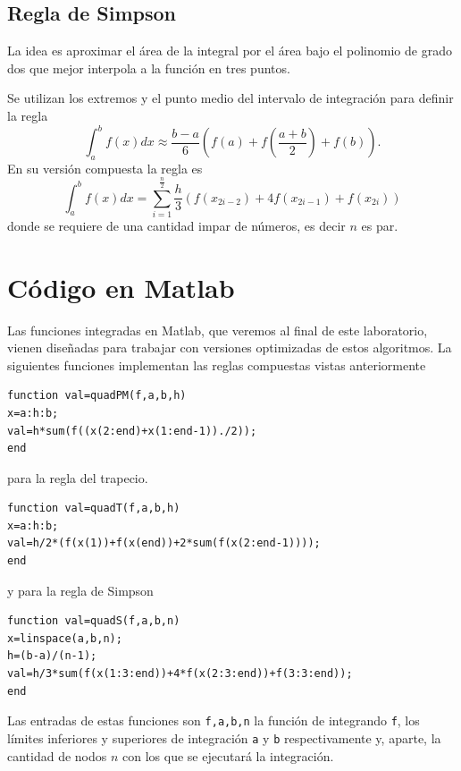 \documentclass[11pt]{article}
\begin{document}
\subsection{Regla de Simpson}
La idea es aproximar el \'area de la integral por el \'area bajo el polinomio de grado dos que mejor interpola a la funci\'on en tres puntos.
\begin{center}
\end{center}
Se utilizan los extremos y el punto medio del intervalo de integraci\'on para definir la regla
$$\int_a^bf(x)dx\approx\frac{b-a}{6}\left(f(a)+f\left(\frac{a+b}{2}\right)+f(b)\right).$$
En su versi\'on compuesta la regla es
$$\int_a^b f(x)dx = \sum_{i=1}^{\frac{n}{2}} \frac{h}{3}\left(f(x_{2i-2})+4f(x_{2i-1})+f(x_{2i})\right)$$
donde se requiere de una cantidad impar de n\'umeros, es decir $n$ es par. 

\section{C\'odigo en Matlab}
Las funciones integradas en Matlab, que veremos al final de este laboratorio, vienen diseñadas para trabajar con versiones optimizadas de estos algoritmos. La siguientes funciones implementan las reglas compuestas vistas anteriormente
\begin{lstlisting}
function val=quadPM(f,a,b,h)
x=a:h:b;
val=h*sum(f((x(2:end)+x(1:end-1))./2));
end
\end{lstlisting}
para la regla del trapecio. 
\begin{lstlisting}
function val=quadT(f,a,b,h)
x=a:h:b;
val=h/2*(f(x(1))+f(x(end))+2*sum(f(x(2:end-1))));
end
\end{lstlisting}
y para la regla de Simpson
\begin{lstlisting}
function val=quadS(f,a,b,n)
x=linspace(a,b,n);
h=(b-a)/(n-1);
val=h/3*sum(f(x(1:3:end))+4*f(x(2:3:end))+f(3:3:end));
end
\end{lstlisting}
Las entradas de estas funciones son \texttt{f,a,b,n} la funci\'on de integrando \texttt{f}, los l\'imites inferiores y superiores de integraci\'on \texttt{a} y \texttt{b} respectivamente y, aparte, la cantidad de nodos $n$ con los que se ejecutar\'a la integraci\'on.
\end{document}
